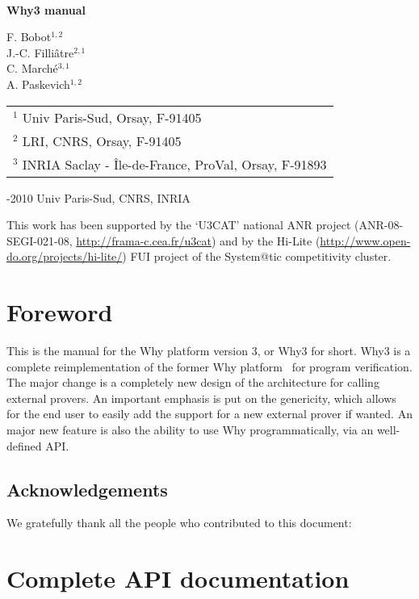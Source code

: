 \documentclass[a4paper]{memoir}
\begin{document}
\thispagestyle{empty}

\begin{center}

~

\vfill

{\Huge\bfseries Why3 manual}

\vfill

{\Large F. Bobot$^{1,2}$ \\ 
J.-C. Filli\^atre$^{2,1}$  \\ 
C. March\'e$^{3,1}$ \\ 
A. Paskevich$^{1,2}$}

\vfill

\begin{tabular}{l}
$^1$ Univ Paris-Sud, Orsay, F-91405 \\
$^2$ LRI, CNRS, Orsay, F-91405 \\
$^3$ INRIA Saclay - \^Ile-de-France, ProVal, Orsay, F-91893 
\end{tabular}

\vfill

\begin{flushleft}
  -2010 Univ Paris-Sud, CNRS, INRIA

  This work has been supported by the `U3CAT' national ANR project
  (ANR-08-SEGI-021-08, \url{http://frama-c.cea.fr/u3cat}) and by the
  Hi-Lite (\url{http://www.open-do.org/projects/hi-lite/}) FUI project of the
  System@tic competitivity cluster.

\end{flushleft}
\end{center}

\cleardoublepage

\tableofcontents

\chapter*{Foreword}

This is the manual for the Why platform version 3, or Why3 for
short. Why3 is a complete reimplementation of the former Why
platform~\cite{filliatre07cav} for program verification.  The major
change is a completely new design of the architecture for calling
external provers. An important emphasis is put on the genericity,
which allows for the end user to easily add the support for a new
external prover if wanted.  An major new feature is also the ability
to use Why programmatically, via an well-defined API.

\section*{Acknowledgements}

We gratefully thank all the people who contributed to this document:









\chapter{Complete API documentation}





\end{document}
